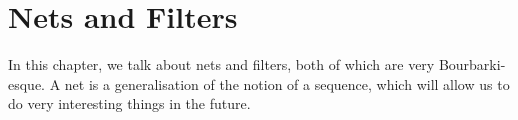 \chapter{Nets and Filters}
\thispagestyle{empty}

In this chapter, we talk about nets and filters, both of which are very Bourbarki-esque. A net is a generalisation of the notion of a sequence, which will allow us to do very interesting things in the future.




